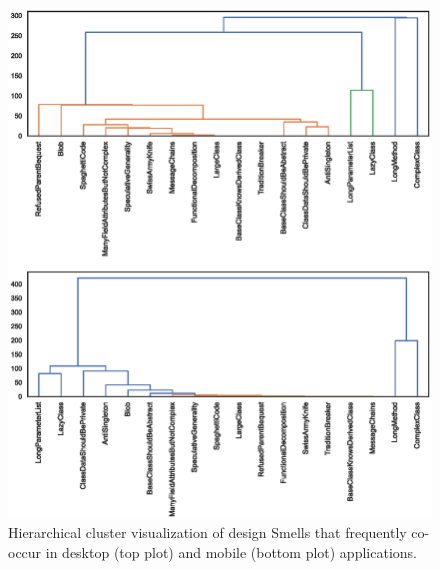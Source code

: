 \documentclass[AMA,Times1COL]{WileyNJDv5} %
\begin{document}
	\begin{figure}[!h]
		\centerline{\includegraphics[scale=0.8]{figures/dendogram_ds}}
		\caption{Hierarchical cluster visualization of design Smells that frequently co-occur in desktop (top plot) and mobile (bottom plot) applications.\label{fig:dendogram_ds}}
	\end{figure}
\end{document}

